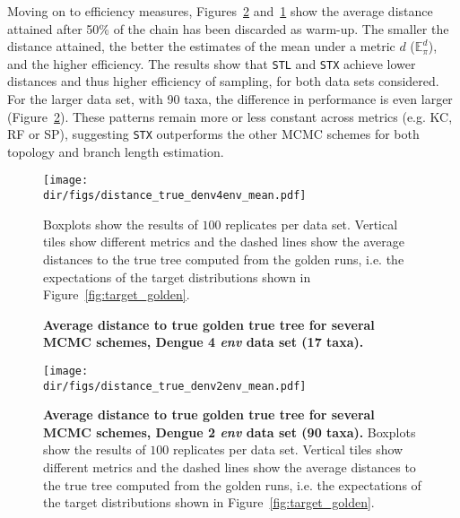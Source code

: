 Moving on to efficiency measures, Figures~\ref{fig:distance_true_denv2_mean} and~\ref{fig:distance_true_denv4_mean} show the average distance attained after 50\% of the chain has been discarded as warm-up.
The smaller the distance attained, the better the estimates of the mean under a metric $d$ ($\mathbb{E}_\pi^d$), and the higher efficiency.  
The results show that \verb|STL| and \verb|STX| achieve lower distances and thus higher efficiency of sampling, for both data sets considered.
For the larger data set, with 90 taxa, the difference in performance is even larger (Figure~\ref{fig:distance_true_denv2_mean}).
These patterns remain more or less constant across metrics (e.g. KC, RF or SP), suggesting \verb|STX| outperforms the other MCMC schemes for both topology and branch length estimation. 

\begin{figure}[!ht]
\begin{center}
\texttt{[image: \\dir/figs/distance\_true\_denv4env\_mean.pdf]} 
\end{center}
 \caption[Average distance to true golden true tree for several MCMC schemes, Dengue 4 \textit{env} data set (17 taxa).]{\textbf{Average distance to true golden true tree for several MCMC schemes, Dengue 4 \textit{env} data set (17 taxa).}
  }
  Boxplots show the results of $100$ replicates per data set.
  Vertical tiles show different metrics and the dashed lines show the average distances to the true tree computed from the golden runs, i.e. the expectations of the target distributions shown in Figure~\ref{fig:target_golden}.
 \label{fig:distance_true_denv4_mean}
\end{figure}

\begin{figure}[!ht]
\begin{center}
\texttt{[image: \\dir/figs/distance\_true\_denv2env\_mean.pdf]} 
\end{center}
 \caption[Average distance to true golden true tree for several MCMC schemes, Dengue 2 \textit{env} data set (90 taxa).]{\textbf{Average distance to true golden true tree for several MCMC schemes, Dengue 2 \textit{env} data set (90 taxa).}
  Boxplots show the results of $100$ replicates per data set.
  Vertical tiles show different metrics and the dashed lines show the average distances to the true tree computed from the golden runs, i.e. the expectations of the target distributions shown in Figure~\ref{fig:target_golden}.
  }
 \label{fig:distance_true_denv2_mean}
\end{figure}

